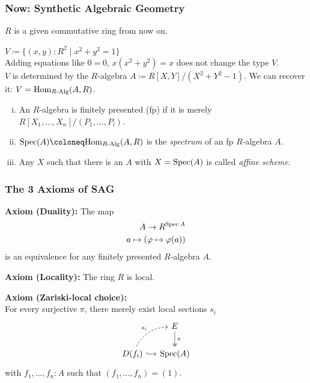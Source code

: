 \documentclass{beamer}
\begin{document}
\begin{frame}
  \frametitle{Now: \textbf{Synthetic} Algebraic Geometry}
  \pause
  $R$ is a given commutative ring from now on. \\
  \vspace{0.4cm}
  \pause

  $V\coloneq \{(x,y):R^2\mid x^2+y^2=1 \}$ \\

  \pause
  Adding equations like $0=0$, $x(x^2+y^2)=x$ does not change the type $V$. \\
  \pause
  $V$ is determined by the $R$-algebra $A\coloneq R[X,Y]/(X^2+Y^2-1)$.
  \pause
  We can recover it: $V=\mathrm{Hom}_{R\text{-}\mathrm{Alg}}(A,R)$. \\
  \vspace{0.4cm}
  \pause
  \begin{definition}
    \begin{enumerate}[(i)]
    \item An $R$-algebra is finitely presented (fp) if it is merely $R[X_1,\dots,X_n]/(P_1,\dots,P_l)$.
    \item $\Spec(A)\coloneq \Hom_{\Alg{R}}(A,R)$ is the \emph{spectrum} of an fp $R$-algebra $A$.
    \item Any $X$ such that there is an $A$ with $X=\operatorname{Spec}(A)$ is called \emph{affine scheme}.
    \end{enumerate}
  \end{definition}
\end{frame}

\begin{frame}
  \frametitle{The 3 Axioms of SAG}
    \textbf{Axiom (Duality):}
    The map
    \begin{align*}
      A \to R^{\operatorname{Spec} A} \\
      a\mapsto (\varphi\mapsto \varphi(a))
    \end{align*}
    is an equivalence
    for any finitely presented $R$-algebra $A$.
  
  \vspace{1.5mm}
  \textbf{Axiom (Locality):} The ring $R$ is local.

  \vspace{1.5mm}
  \textbf{Axiom (Zariski-local choice):}\\
  For every surjective $\pi$, there merely exist local sections $s_i$
  \[ \begin{tikzcd}[ampersand replacement=\&, column sep=small]
    \& E \ar[d, two heads, "\pi"] \\
    D(f_i) \ar[r, hook] \ar[ur, bend left, dashed, "s_i"] \& \Spec(A)
  \end{tikzcd} \]
  with $f_1, \dots, f_n : A$ such that $(f_1,\dots,f_n)=(1)$.
\end{frame}
\end{document}
